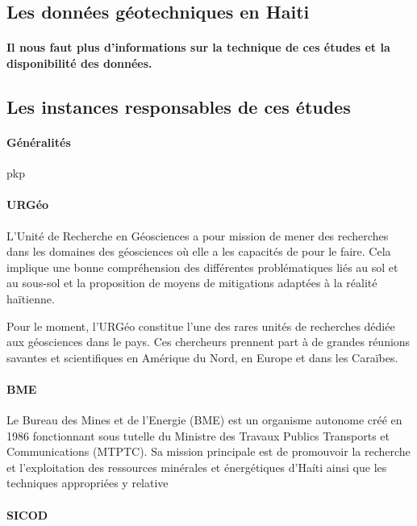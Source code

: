         \subsection{Les données géotechniques en Haiti}
        \paragraph{Il nous faut plus d'informations sur la technique de ces études et la disponibilité
        des données.}
        \lipsum[1]
        \subsection{Les instances responsables de ces études}
        \paragraph{Généralités}
            pkp
        \paragraph{URGéo}
        L'Unité de Recherche en Géosciences a pour mission de mener des recherches dans les
        domaines des géosciences où elle a les capacités de pour le faire.
        Cela implique une bonne compréhension des différentes problématiques liés au sol et
        au sous-sol et la proposition de moyens de mitigations adaptées à la réalité haïtienne.
        \cite{mission_urgeo}
        \par
        Pour le moment, l’URGéo constitue l’une des rares unités de recherches dédiée aux
        géosciences dans le pays. 
        Ces chercheurs prennent part à de grandes réunions savantes et scientifiques en
        Amérique du Nord, en Europe et dans les Caraïbes.
        \cite{urgeo_nouvelliste}
        \paragraph{BME}
        Le Bureau des Mines et de l’Energie (BME) est un organisme autonome créé en 
        1986 fonctionnant sous  tutelle du Ministre des Travaux Publics Transports 
        et Communications (MTPTC). Sa mission principale est de promouvoir la recherche
        et l'exploitation des ressources minérales et énergétiques d'Haíti ainsi que les 
        techniques appropriées y relative
        \paragraph{SICOD}

